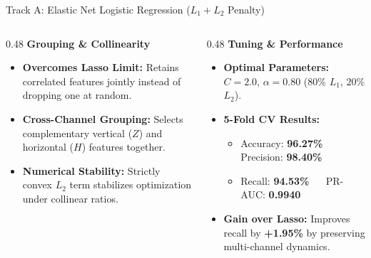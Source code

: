 \documentclass[aspectratio=169,11pt]{beamer}
\begin{document}
\begin{frame}{Track A: Elastic Net Logistic Regression ($L_1 + L_2$ Penalty)}
  \vspace*{0.05cm}

  \centering

  \vspace*{0.12cm}
  \begin{columns}[T,onlytextwidth]
    \begin{column}{0.48\textwidth}
      \textbf{\small\color{navy} Grouping \& Collinearity}
      \vspace*{0.08cm}
      \begin{itemize}\setlength{\itemsep}{0.25em}\footnotesize
        \item \textbf{Overcomes Lasso Limit:} Retains correlated features jointly instead of dropping one at random.
        \item \textbf{Cross-Channel Grouping:} Selects complementary vertical ($Z$) and horizontal ($H$) features together.
        \item \textbf{Numerical Stability:} Strictly convex $L_2$ term stabilizes optimization under collinear ratios.
      \end{itemize}
    \end{column}
    \hfill
    \begin{column}{0.48\textwidth}
      \textbf{\small\color{blastred} Tuning \& Performance}
      \vspace*{0.08cm}
      \begin{itemize}\setlength{\itemsep}{0.25em}\footnotesize
        \item \textbf{Optimal Parameters:} $C = 2.0$, $\alpha = 0.80$ ($80\%$ $L_1$, $20\%$ $L_2$).
        \item \textbf{5-Fold CV Results:}
          \begin{itemize}\scriptsize
            \item Accuracy: \textbf{96.27\%} $\quad$ Precision: \textbf{98.40\%}
            \item Recall: \textbf{94.53\%} $\quad$ PR-AUC: \textbf{0.9940}
          \end{itemize}
        \item \textbf{Gain over Lasso:} Improves recall by \textbf{+1.95\%} by preserving multi-channel dynamics.
      \end{itemize}
    \end{column}
  \end{columns}
\end{frame}
\end{document}
